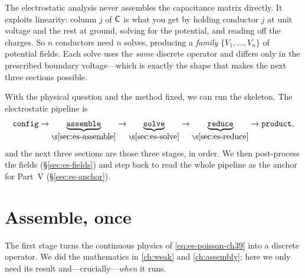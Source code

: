 \begin{keyidea}
The electrostatic analysis never assembles the capacitance matrix directly. It
exploits linearity: column $j$ of $\mathsf{C}$ is what you get by holding conductor
$j$ at unit voltage and the rest at ground, solving for the potential, and reading
off the charges. So $n$ conductors need $n$ solves, producing a \emph{family}
$\{V_1,\dots,V_n\}$ of potential fields. Each solve uses the \emph{same} discrete
operator and differs only in the prescribed boundary voltage---which is exactly the
shape that makes the next three sections possible.
\end{keyidea}

With the physical question and the method fixed, we can run the skeleton. The
electrostatic pipeline is
\[
  \texttt{config} \to \underbrace{\texttt{assemble}}_{\S\ref{sec:es-assemble}}
  \to \underbrace{\texttt{solve}}_{\S\ref{sec:es-solve}}
  \to \underbrace{\texttt{reduce}}_{\S\ref{sec:es-reduce}} \to \texttt{product},
\]
and the next three sections are those three stages, in order. We then post-process
the fields (\S\ref{sec:es-fields}) and step back to read the whole pipeline as the
anchor for Part~V (\S\ref{sec:es-anchor}).

\section{Assemble, once}
\label{sec:es-assemble}

The first stage turns the continuous physics of \cref{eq:es-poisson-ch39} into a
discrete operator. We did the mathematics in \cref{ch:weak} and \cref{ch:assembly};
here we only need its result and---crucially---\emph{when} it runs.

